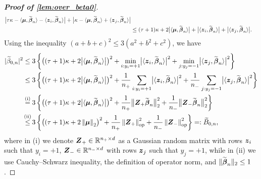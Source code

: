 \begin{proof}[\textbf{Proof of \cref{lem:over_beta0}}]
\begin{equation*}
\begin{aligned}
        \bigl| \tau \kappa - \langle \text{\boldmath $\mu$}, \widetilde{{\boldsymbol{\beta}}}_n \rangle - \langle \text{\boldmath $z$}_i, \widetilde{{\boldsymbol{\beta}}}_n \rangle \bigr|
        + 
        \bigl| \kappa - \langle \text{\boldmath $\mu$}, \widetilde{{\boldsymbol{\beta}}}_n \rangle + \langle \text{\boldmath $z$}_j, \widetilde{{\boldsymbol{\beta}}}_n \rangle  \bigr| \\
        & \le (\tau + 1)\kappa + 2\bigl| \langle \text{\boldmath $\mu$}, \widetilde{{\boldsymbol{\beta}}}_n \rangle \bigr| + 
        \bigl| \langle \text{\boldmath $z$}_i, \widetilde{{\boldsymbol{\beta}}}_n \rangle \bigr| + \bigl| \langle \text{\boldmath $z$}_j, \widetilde{{\boldsymbol{\beta}}}_n \rangle \bigr|.
    \end{aligned}
\end{equation*}
Using the inequality $(a+b+c)^2 \le 3(a^2 + b^2 + c^2)$, we have
\begin{equation*}
    \begin{aligned}
        | \wt\beta_{0, n} |^2 
        & \le
        3 \left\{  \bigl( (\tau + 1)\kappa + 2\bigl| \< \bmu, \wt\vbeta_n \> \bigr| \bigr)^2
        + 
        \min_{i: y_i = +1} \bigl| \< \zz_i, \wt\vbeta_n \> \bigr|^2 + 
        \min_{j: y_j = -1} \bigl| \< \zz_j, \wt\vbeta_n \> \bigr|^2  \right\} \\
        & \le 
        3 \, \biggl\{  \bigl( (\tau + 1)\kappa + 2\bigl| \< \bmu, \wt\vbeta_n \> \bigr| \bigr)^2
        + 
        \frac{1}{n_+}\sum_{i: y_i = +1} \bigl| \< \zz_i, \wt\vbeta_n \> \bigr|^2 + 
        \frac{1}{n_-}\sum_{j: y_j = -1} \bigl| \< \zz_j, \wt\vbeta_n \> \bigr|^2  \biggr\} \\
        & \overset{\mathmakebox[0pt][c]{\text{(i)}}}{=} 
        3 \, \biggl\{  \bigl( (\tau + 1)\kappa + 2\bigl| \< \bmu, \wt\vbeta_n \> \bigr| \bigr)^2
        + 
        \frac{1}{n_+} \bigl\| \ZZ_+ \wt\vbeta_n \bigr\|_2^2 + 
        \frac{1}{n_-} \bigl\| \ZZ_- \wt\vbeta_n \bigr\|_2^2  \biggr\} \\
        & \overset{\mathmakebox[0pt][c]{\text{(ii)}}}{\le}
        3 \, \biggl\{  \bigl( (\tau + 1)\kappa + 2 \norm{\bmu}_2 \bigr)^2
        + 
        \frac{1}{n_+} \norm{ \ZZ_+ }_{\mathrm{op}}^2 + 
        \frac{1}{n_-} \norm{ \ZZ_- }_{\mathrm{op}}^2  \biggr\} =: \wt B_{0, n},
    \end{aligned}
\end{equation*}
where in (i) we denote $\text{\boldmath $Z$}_+ \in \mathbb{R}^{n_+ \times d}$ as a Gaussian random matrix with rows $\text{\boldmath $z$}_i$ such that $y_i = +1$, $\text{\boldmath $Z$}_- \in \mathbb{R}^{n_- \times d}$ with rows $\text{\boldmath $z$}_j$ such that $y_j = +1$, while in (ii) we use Cauchy--Schwarz inequality, the definition of operator norm, and $\| \widetilde{{\boldsymbol{\beta}}}_n \|_2 \le 1$. 


\end{proof}
